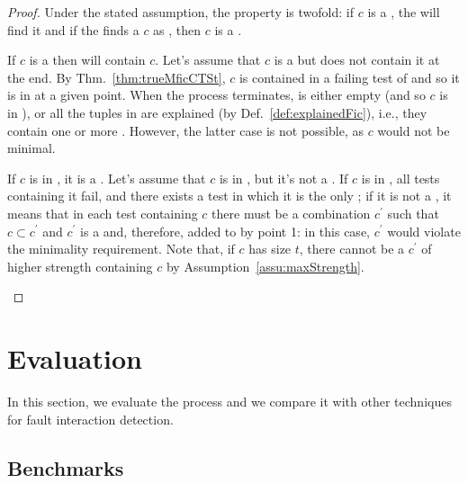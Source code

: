 \begin{tikzborder}{\cite{Gargantini16:validation}}
\begin{tikzborder}{\cite{gargantini_combinatorial_2017}}
\begin{tikzborder}{\cite{gargantini_combinatorial_2017}}
\begin{tikzborder}{\cite{garn2019}}
\begin{tikzborder}{\cite{arcaini2019achieving}}
\begin{tikzborder}{}
\begin{proof}
	Under the stated assumption, the property is twofold: if $c$ is a \truemfic, the \mix will find it and if the \mix finds a $c$ as \mfic, then $c$ is a \truemfic.
	\begin{compactenum}
		\item If $c$ is a \truemfic then \isoMficsSet will contain $c$. Let's assume that $c$ is a \truemfic but \isoMficsSet does not contain it at the end. By Thm.~\ref{thm:trueMficCTSt}, $c$ is contained in a failing test of \ts and so it is in \ft at a given point. When the process terminates, \ft is either empty (and so $c$ is in \isoMficsSet), or all the tuples in \ft are explained (by Def.~\ref{def:explainedFic}), i.e., they contain one or more \isoMfic. However, the latter case is not possible, as $c$ would not be minimal.
		\item If $c$ is in \isoMficsSet, it is a \truemfic. Let's assume that $c$ is in \isoMficsSet, but it's not a \truemfic. If $c$ is in \isoMficsSet, all tests containing it fail, and there exists a test in which it is the only \mfic; if it is not a \truemfic, it means that in each test containing $c$ there must be a combination $c^\prime$ such that $c \subset c^\prime$ and $c^\prime$ is a \truemfic and, therefore, added to \isoMficsSet by point 1: in this case, $c^\prime$ would violate the minimality requirement. Note that, if $c$ has size $t$, there cannot be a \truemfic $c^\prime$ of higher strength containing $c$ by Assumption~\ref{assu:maxStrength}.
	\end{compactenum}
\end{proof}
\end{tikzborder}

\section{Evaluation}\label{sec:evaluation3}

\begin{tikzborder}{}
In this section, we evaluate the process and we compare it with other techniques for fault interaction detection.
\end{tikzborder}

\subsection{Benchmarks}\label{sec:benchmarks}


\end{tikzborder}
\end{tikzborder}
\end{tikzborder}
\end{tikzborder}
\end{tikzborder}
